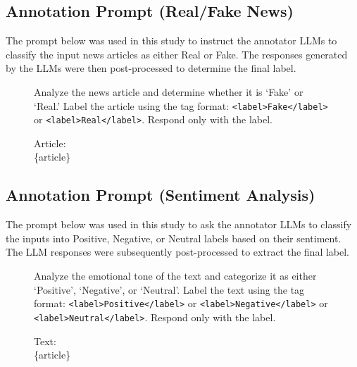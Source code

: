 \subsection{Annotation Prompt (Real/Fake News)}
\label{annotation_real}
The prompt below was used in this study to instruct the annotator LLMs to classify the input news articles as either Real or Fake. The responses generated by the LLMs were then post-processed to determine the final label.
\begin{figure}[h]
    \begin{tcolorbox}[colback=gray!10, colframe=gray!50, rounded corners, width=\linewidth, arc=2mm, boxrule=0.5mm, title=]

Analyze the news article and determine whether it is `Fake' or `Real.' 
            Label the article using the tag format: \texttt{<label>Fake</label>} or \texttt{<label>Real</label>}.
            Respond only with the label.
\vspace{0.3cm} 

Article: \\
\{article\} \\
\end{tcolorbox}
\end{figure}

\subsection{Annotation Prompt (Sentiment Analysis)}
\label{annotation_sentiment}
The prompt below was used in this study to ask the annotator LLMs to classify the inputs into Positive, Negative, or Neutral labels based on their sentiment. The LLM responses were subsequently post-processed to extract the final label.
\begin{figure}[h]
    \begin{tcolorbox}[colback=gray!10, colframe=gray!50, rounded corners, width=\linewidth, arc=2mm, boxrule=0.5mm, title=]

\vspace{0.3cm} 
Analyze the emotional tone of the text and categorize it as either `Positive',  `Negative', or `Neutral'. 
            Label the text using the tag format: \texttt{<label>Positive</label>} or \texttt{<label>Negative</label>} or \texttt{<label>Neutral</label>}. 
            Respond only with the label.
\vspace{0.3cm} 

Text: \\
\{article\} \\
\end{tcolorbox}
\end{figure}

